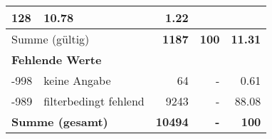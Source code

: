 \begin{longtable}{lXrrr}
       \num{128} &
       \num[round-mode=places,round-precision=2]{10.78} &
         \num[round-mode=places,round-precision=2]{1.22} \\
     \midrule
     \multicolumn{2}{l}{Summe (gültig)} &
       \textbf{\num{1187}} &
     \textbf{\num{100}} &
       \textbf{\num[round-mode=places,round-precision=2]{11.31}} \\
     \multicolumn{5}{l}{\textbf{Fehlende Werte}}\\
       -998 &
       keine Angabe &
         \num{64} &
        - &
         \num[round-mode=places,round-precision=2]{0.61} \\
       -989 &
       filterbedingt fehlend &
         \num{9243} &
        - &
         \num[round-mode=places,round-precision=2]{88.08} \\
     \midrule
     \multicolumn{2}{l}{\textbf{Summe (gesamt)}} &
          \textbf{\num{10494}} &
        \textbf{-} &
        \textbf{\num{100}} \\
     \bottomrule
     \end{longtable}
     
